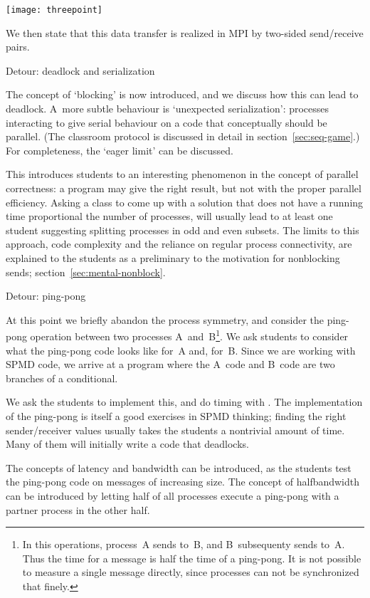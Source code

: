\texttt{[image: threepoint]}

We then state that this data transfer is realized in MPI by two-sided
send/receive pairs.

 {Detour: deadlock and serialization}
\label{sec:p-serial}

The concept of `blocking' is now introduced, and we discuss how this
can lead to deadlock. A~more subtle behaviour is `unexpected
serialization': processes interacting to give serial behaviour on a
code that conceptually should be parallel.
(The classroom protocol is discussed in detail in section~\ref{sec:seq-game}.)
For completeness, the `eager limit' can be discussed.

This introduces students to an interesting phenomenon in the concept
of parallel correctness: a program may give the right result,
but not with the proper parallel efficiency.
Asking a class to come up with a solution that does not have a running
time proportional the number of processes, will usually lead to
at least one student suggesting splitting processes in odd and even
subsets. The limits to this approach, code complexity and the reliance
on regular process connectivity, are explained to the students as a
preliminary to the motivation for nonblocking sends; section~\ref{sec:mental-nonblock}.

 {Detour: ping-pong}

At this point we briefly abandon the process symmetry, and consider
the ping-pong operation between two processes A~and~B\footnote {In this
operations, process~A sends to~B, and B~subsequenty sends to~A. Thus
the time for a message is half the time of a ping-pong. It is not
possible to measure a single message directly, since processes can not
be synchronized that finely.}.
We ask students
to consider what the ping-pong code looks like for~A and, for~B.
Since we are working with SPMD code, we arrive at a program where the
A~code and B~code are two branches of a conditional.

We ask the students to implement this, and do timing with
. The implementation of the ping-pong is itself a good
exercises in SPMD thinking; finding the right sender/receiver values
usually takes the students a nontrivial amount of time. Many of them
will initially write a code that deadlocks.

The concepts of latency and bandwidth can be introduced, as the students
test the ping-pong code on messages of increasing size.
The concept of halfbandwidth can be introduced by letting half of all processes
execute a ping-pong with a partner process in the other half.

